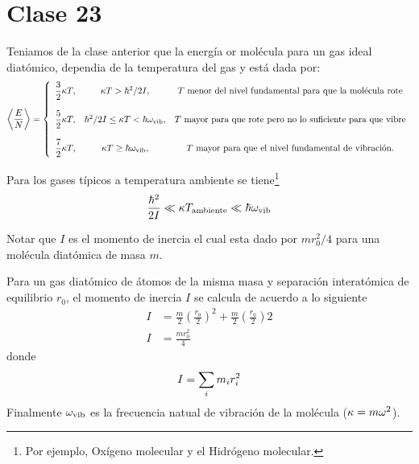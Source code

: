 \section{Clase 23}
Teniamos de la clase anterior que la energía or molécula para un gas ideal diatómico, dependia de la temperatura del gas y está dada por:
\begin{equation}
  \ev{\frac{E}{N}}=\left\{\begin{array}{ccc}
  	\dfrac{3}{2}\k T,& \k T>\hbar^2/2I,& \text{$T$ menor del nivel fundamental para que la molécula rote}\\\\
  	\dfrac{5}{2}\k T,& \hbar^2/2I\leq \k T<\hbar\omega_{\rm vib},& \text{$T$ mayor para que rote pero no lo suficiente para que vibre}\\\\
  	\dfrac{7}{2}\k T,& \k T\geq \hbar\omega_{\rm vib},& \text{$T$ mayor para que el nivel fundamental de vibración.}
  \end{array}\right.
\end{equation}


Para los gases típicos a temperatura ambiente se tiene\footnote{Por ejemplo, Oxígeno molecular y el Hidrógeno molecular.}
\begin{equation}
  \frac{\hbar^2}{2I}\ll \kappa T_{\rm ambiente}\ll \hbar\omega_{\rm vib}
\end{equation}

Notar que $I$ es el momento de inercia el cual esta dado por $mr_0^2/4$ para una molécula diatómica de masa $m$.

Para un gas diatómico de átomos de la misma masa y separación interatómica de equilibrio $r_0$, el momento de inercia $I$ se calcula de acuerdo a lo siguiente
\begin{align}
  I&=\frac{m}{2}\left(\frac{r_0}{2}\right)^2+\frac{m}{2}\left(\frac{r_0}{2}\right)2\\
  I&=\frac{mr_0^2}{4}
\end{align}
donde 
\begin{equation}
  I=\sum_i m_ir_i^2
\end{equation}
Finalmente $\omega_{\rm vib}$ es la frecuencia natual de vibración de la molécula ($\kappa=m\omega^2$).

